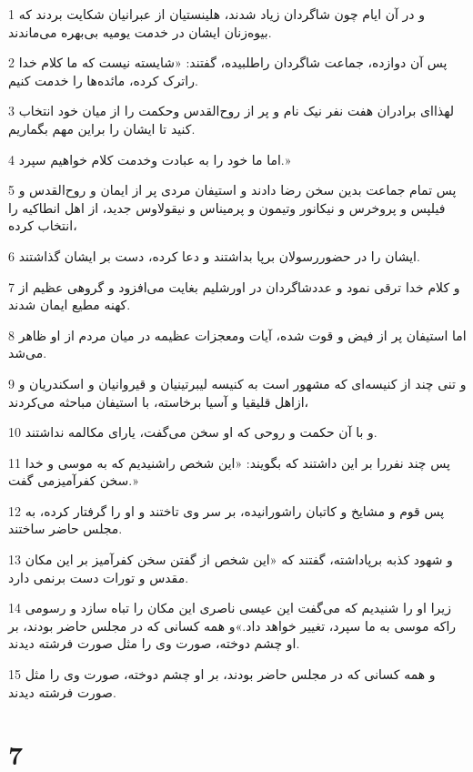 \par 1 و در آن ایام چون شاگردان زیاد شدند، هلینستیان از عبرانیان شکایت بردند که بیوه‌زنان ایشان در خدمت یومیه بی‌بهره می‌ماندند.
\par 2 پس آن دوازده، جماعت شاگردان راطلبیده، گفتند: «شایسته نیست که ما کلام خدا راترک کرده، مائده‌ها را خدمت کنیم.
\par 3 لهذا‌ای برادران هفت نفر نیک نام و پر از روح‌القدس وحکمت را از میان خود انتخاب کنید تا ایشان را براین مهم بگماریم.
\par 4 اما ما خود را به عبادت وخدمت کلام خواهیم سپرد.»
\par 5 پس تمام جماعت بدین سخن رضا دادند و استیفان مردی پر از ایمان و روح‌القدس و فیلپس و پروخرس و نیکانور وتیمون و پرمیناس و نیقولاوس جدید، از اهل انطاکیه را انتخاب کرده،
\par 6 ایشان را در حضوررسولان برپا بداشتند و دعا کرده، دست بر ایشان گذاشتند.
\par 7 و کلام خدا ترقی نمود و عددشاگردان در اورشلیم بغایت می‌افزود و گروهی عظیم از کهنه مطیع ایمان شدند.
\par 8 اما استیفان پر از فیض و قوت شده، آیات ومعجزات عظیمه در میان مردم از او ظاهر می‌شد.
\par 9 و تنی چند از کنیسه‌ای که مشهور است به کنیسه لیبرتینیان و قیروانیان و اسکندریان و ازاهل قلیقیا و آسیا برخاسته، با استیفان مباحثه می‌کردند،
\par 10 و با آن حکمت و روحی که او سخن می‌گفت، یارای مکالمه نداشتند.
\par 11 پس چند نفررا بر این داشتند که بگویند: «این شخص راشنیدیم که به موسی و خدا سخن کفرآمیزمی گفت.»
\par 12 پس قوم و مشایخ و کاتبان راشورانیده، بر سر وی تاختند و او را گرفتار کرده، به مجلس حاضر ساختند.
\par 13 و شهود کذبه برپاداشته، گفتند که «این شخص از گفتن سخن کفرآمیز بر این مکان مقدس و تورات دست برنمی دارد.
\par 14 زیرا او را شنیدیم که می‌گفت این عیسی ناصری این مکان را تباه سازد و رسومی راکه موسی به ما سپرد، تغییر خواهد داد.»و همه کسانی که در مجلس حاضر بودند، بر او چشم دوخته، صورت وی را مثل صورت فرشته دیدند.
\par 15 و همه کسانی که در مجلس حاضر بودند، بر او چشم دوخته، صورت وی را مثل صورت فرشته دیدند.

\chapter{7}

